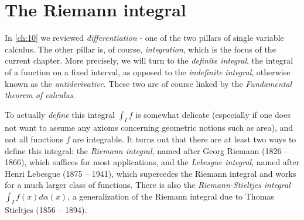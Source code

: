 \chapter{The Riemann integral}\label{ch:11}

\begin{note}
  In \cref{ch:10} we reviewed \emph{differentiation} - one of the two pillars of single variable calculus.
  The other pillar is, of course, \emph{integration}, which is the focus of the current chapter.
  More precisely, we will turn to the \emph{definite integral}, the integral of a function on a fixed interval, as opposed to the \emph{indefinite integral}, otherwise known as the \emph{antiderivative}.
  These two are of course linked by the \emph{Fundamental theorem of calculus}.
\end{note}

\begin{note}
  To actually \emph{define} this integral \(\int_I f\) is somewhat delicate (especially if one does not want to assume any axioms concerning geometric notions such as area), and not all functions \(f\) are integrable.
  It turns out that there are at least two ways to define this integral:
  the \emph{Riemann integral}, named after Georg Riemann (1826 -- 1866), which suffices for most applications, and the \emph{Lebesgue integral}, named after Henri Lebesgue (1875 -- 1941), which supercedes the Riemann integral and works for a much larger class of functions.
  There is also the \emph{Riemann-Stieltjes integral} \(\int_I f(x) d \alpha(x)\), a generalization of the Riemann integral due to Thomas Stieltjes (1856 -- 1894).
\end{note}











